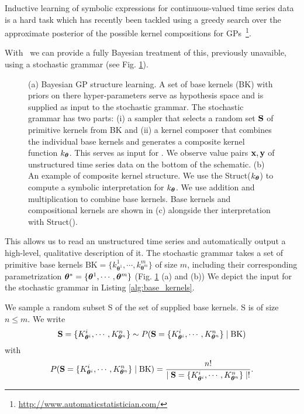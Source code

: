 Inductive learning of symbolic expressions for continuous-valued time series
data is a hard task which has recently been tackled using a greedy search over 
the approximate posterior of the possible kernel compositions for
\ac{GP}s~\citep{duvenaud2013structure,lloyd2014automatic}\footnote{\url{http://www.automaticstatistician.com/}}.

With \gpmem\ we can provide a fully Bayesian treatment of this, previously unavaible,
using a stochastic grammar  (see Fig. \ref{fig:schema}).
\begin{figure}
\centering

\caption{\small(a) Bayesian GP structure learning. A set of
base kernels (BK) with priors on there hyper-parameters serve as hypothesis space
and is supplied as input to the stochastic grammar. The stochastic grammar has
two parts: (i) a sampler that selects a random set $\mathbf{S}$  of primitive kernels from BK
and (ii) a kernel composer that combines the individual base kernels and generates
a composite kernel function
$k_{\bm{\theta}}$. This serves as input for
\gpmem.  We observe value pairs $\mathbf{x},\mathbf{y}$ of unstructured time series data on
the bottom of the schematic. (b) An example of composite kernel structure. We
use the Struct($k_{\bm{\theta}}$) to compute a symbolic interpretation for
$k_{\bm{\theta}}$. We use addition and multiplication to combine base kernels.
Base kernels and compositional kernels are shown in (c) alongside ther
interpretation with Struct().}\label{fig:schema}
\end{figure}
This allows us to read an unstructured time series and automatically output a high-level,
qualitative description of it. The stochastic grammar takes a set of primitive base kernels 
    $\text{BK}=\{k_{\bm{\theta}^1}^1,\cdots,k_{\bm{\theta}^m}^m\}$
    of size $m$, including their corresponding parametrization
    $\bm{\theta}^*=\{\bm{\theta}^1,\cdots,\bm{\theta}^m\}$ (Fig. \ref{fig:schema} (a) and (b))
We depict the input for the
stochastic grammar in Listing \ref{alg:base_kernels}.

We sample a random subset S of
the set of supplied base kernels. S is of size $n \leq m$. We write
\[
\mathbf{S} = \{K_{\bm{\theta}^i}^i,\cdots,K_{\bm{\theta}^n}^n\}
\sim P(\mathbf{S} = \{K_{\bm{\theta}^i}^i,\cdots,K_{\bm{\theta}^n}^n\} \mid
\text{BK}) 
\]
with
\[
P(\mathbf{S} = \{K_{\bm{\theta}^i}^i,\cdots,K_{\bm{\theta}^n}^n\}\mid \text{BK}) =
\frac{n!}{ \mid \mathbf{S} = \{K_{\bm{\theta}^i}^i,\cdots,K_{\bm{\theta}^n}^n\}\mid !}.
\]

